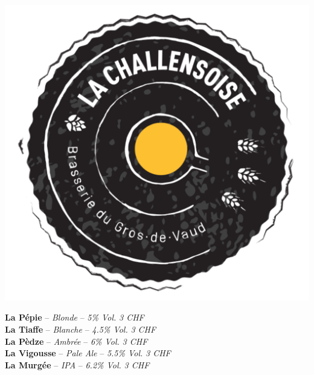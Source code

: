 \documentclass{resume} %
\begin{document}
	\begin{center}
		\includegraphics[width=0.8\linewidth]{../img/challensoise.png}
	\end{center}

	{\bf La Pépie} – {\em Blonde } – {\em 5\% Vol.} \hfill {\em 3 CHF} \\

	{\bf La Tiaffe} – {\em Blanche } – {\em 4.5\% Vol.} \hfill {\em 3 CHF} \\

	{\bf La Pèdze} – {\em Ambrée } – {\em 6\% Vol.} \hfill {\em 3 CHF} \\

	{\bf La Vigousse} – {\em Pale Ale } – {\em 5.5\% Vol.} \hfill {\em 3 CHF} \\

	{\bf La Murgée} – {\em IPA } – {\em 6.2\% Vol.} \hfill {\em 3 CHF} \\
\end{document}
